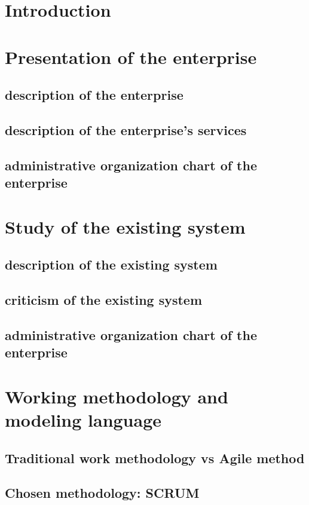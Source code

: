 \documentclass{report}
\begin{document}
\section*{Introduction}
\section{Presentation of the  enterprise}
\subsection{description of the  enterprise }
\subsection{description of the  enterprise's services}
\subsection{administrative organization chart of the enterprise}
\vspace{1em}
\section{Study of the existing system}
\subsection{description of the existing system }
\subsection{criticism of the existing system}
\subsection{administrative organization chart of the enterprise}
\vspace{1em}
\section{Working methodology and modeling language}
\subsection{Traditional work methodology vs Agile method }
\subsection{Chosen methodology: SCRUM}
\end{document}
